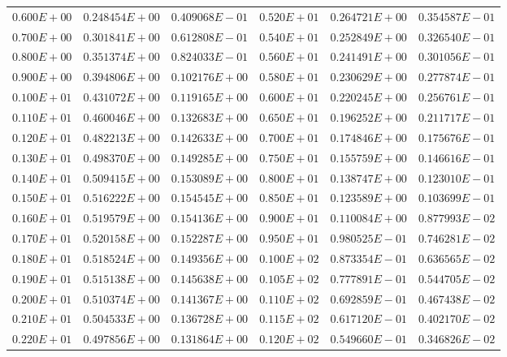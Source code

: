 \begin{table}
\begin{tabular}{rrrrrr}
 $   0.600E+00$ & $    0.248454E+00$ & $    0.409068E-01$ & $   0.520E+01$ & $    0.264721E+00$ & $    0.354587E-01$  \\
 $   0.700E+00$ & $    0.301841E+00$ & $    0.612808E-01$ & $   0.540E+01$ & $    0.252849E+00$ & $    0.326540E-01$  \\
 $   0.800E+00$ & $    0.351374E+00$ & $    0.824033E-01$ & $   0.560E+01$ & $    0.241491E+00$ & $    0.301056E-01$  \\
 $   0.900E+00$ & $    0.394806E+00$ & $    0.102176E+00$ & $   0.580E+01$ & $    0.230629E+00$ & $    0.277874E-01$  \\
 $   0.100E+01$ & $    0.431072E+00$ & $    0.119165E+00$ & $   0.600E+01$ & $    0.220245E+00$ & $    0.256761E-01$  \\
 $   0.110E+01$ & $    0.460046E+00$ & $    0.132683E+00$ & $   0.650E+01$ & $    0.196252E+00$ & $    0.211717E-01$  \\
 $   0.120E+01$ & $    0.482213E+00$ & $    0.142633E+00$ & $   0.700E+01$ & $    0.174846E+00$ & $    0.175676E-01$  \\
 $   0.130E+01$ & $    0.498370E+00$ & $    0.149285E+00$ & $   0.750E+01$ & $    0.155759E+00$ & $    0.146616E-01$  \\
 $   0.140E+01$ & $    0.509415E+00$ & $    0.153089E+00$ & $   0.800E+01$ & $    0.138747E+00$ & $    0.123010E-01$  \\
 $   0.150E+01$ & $    0.516222E+00$ & $    0.154545E+00$ & $   0.850E+01$ & $    0.123589E+00$ & $    0.103699E-01$  \\
 $   0.160E+01$ & $    0.519579E+00$ & $    0.154136E+00$ & $   0.900E+01$ & $    0.110084E+00$ & $    0.877993E-02$  \\
 $   0.170E+01$ & $    0.520158E+00$ & $    0.152287E+00$ & $   0.950E+01$ & $    0.980525E-01$ & $    0.746281E-02$  \\
 $   0.180E+01$ & $    0.518524E+00$ & $    0.149356E+00$ & $   0.100E+02$ & $    0.873354E-01$ & $    0.636565E-02$  \\
 $   0.190E+01$ & $    0.515138E+00$ & $    0.145638E+00$ & $   0.105E+02$ & $    0.777891E-01$ & $    0.544705E-02$  \\
 $   0.200E+01$ & $    0.510374E+00$ & $    0.141367E+00$ & $   0.110E+02$ & $    0.692859E-01$ & $    0.467438E-02$  \\
 $   0.210E+01$ & $    0.504533E+00$ & $    0.136728E+00$ & $   0.115E+02$ & $    0.617120E-01$ & $    0.402170E-02$  \\
 $   0.220E+01$ & $    0.497856E+00$ & $    0.131864E+00$ & $   0.120E+02$ & $    0.549660E-01$ & $    0.346826E-02$  \\

\end{tabular}
\end{table}
